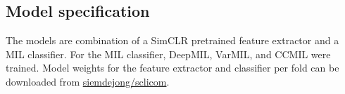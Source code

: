 \subsection{Model specification}
The models are combination of a SimCLR pretrained feature extractor and a MIL classifier.
For the MIL classifier, DeepMIL, VarMIL, and CCMIL were trained.
Model weights for the feature extractor and classifier per fold can be downloaded from \href{https://github.io/siemdejong/sclicom}{ siemdejong/sclicom}.
